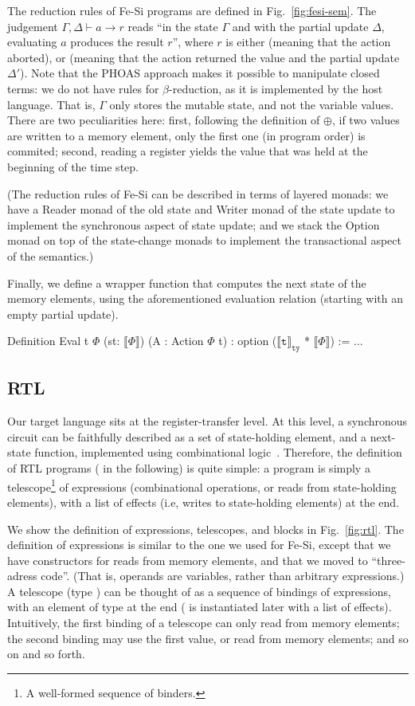 \documentclass{llncs}
\newcommand{\denote}[1]{\llbracket #1 \rrbracket}
\newcommand{\denotety}[1]{\denote{\mathtt{#1}}_{\mathtt{ty}}}
\begin{document}
The reduction rules of Fe-Si programs are defined in
Fig.~\ref{fig:fesi-sem}. The judgement $\Gamma, \Delta \vdash a \to r$
reads ``in the state $\Gamma$ and with the partial update $\Delta$,
evaluating $a$ produces the result $r$'', where $r$ is either
 (meaning that the action aborted), or %
 (meaning that the action returned the value
 and the partial update $\Delta'$). 
%
Note that the PHOAS approach makes it possible to manipulate closed
terms: we do not have rules for $\beta$-reduction, as it is
implemented by the host language.
%
That is, $\Gamma$ only stores the mutable state, and not the variable
values.
%
There are two peculiarities here: first, following the definition of
$\oplus$, if two values are written to a memory element, only the
first one (in program order) is commited; second, reading a register
yields the value that was held at the beginning of the time step. 

(The reduction rules of Fe-Si can be described in terms of layered
monads: we have a Reader monad of the old state and Writer monad of
the state update to implement the synchronous aspect of state update;
and we stack the Option monad on top of the state-change monads to
implement the transactional aspect of the semantics.)

Finally, we define a wrapper function that computes the next state of
the memory elements, using the aforementioned evaluation relation
(starting with an empty partial update). 
\begin{mcoq}
Definition Eval {t} {$\Phi$} (st: $\denote{\Phi}$) (A : Action $\Phi$ t) : option ($\denotety{t}$ * $\denote{\Phi}$) := ...
\end{mcoq}

\subsection{RTL} 
Our target language sits at the register-transfer level. At this
level, a synchronous circuit can be faithfully described as a set of
state-holding element, and a next-state function, implemented using
combinational logic~\cite{DBLP:journals/cj/Gordon02}.
%
Therefore, the definition of RTL programs ( in the
following) is quite simple: a program is simply a telescope\footnote{A
  well-formed sequence of binders.} of expressions (combinational
operations, or reads from state-holding elements), with a list of
effects (i.e, writes to state-holding elements) at the end.

We show the definition of expressions, telescopes, and blocks in
Fig.~\ref{fig:rtl}. 
%
The definition of expressions is similar to the one we used for Fe-Si,
except that we have constructors for reads from memory elements, and
that we moved to ``three-adress code''.
%
(That is, operands are variables, rather than arbitrary expressions.)
%
A telescope (type ) can be thought of as a sequence of
bindings of expressions, with an element of type  at the
end ( is instantiated later with a list of effects).
%
Intuitively, the first binding of a telescope can only read from
memory elements; the second binding may use the first value, or read
from memory elements; and so on and so forth.
\end{document}
